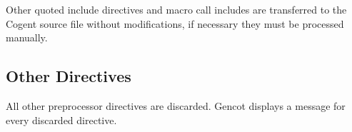 Other quoted include directives and macro call includes are transferred to the Cogent source file without modifications, if
necessary they must be processed manually.

\subsection{Other Directives}

All other preprocessor directives are discarded. Gencot displays a message for every discarded directive.

 
